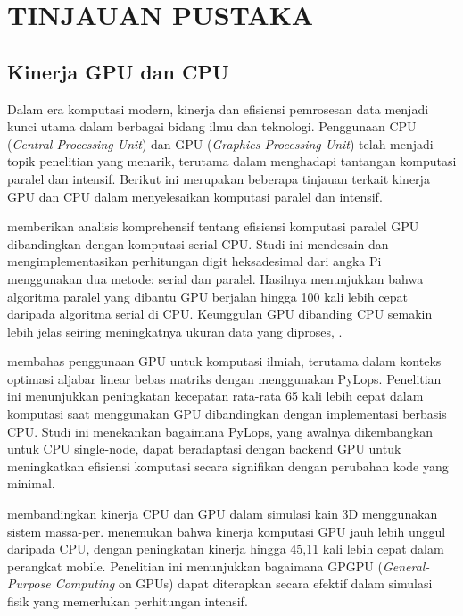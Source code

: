 \chapter{TINJAUAN PUSTAKA}
\label{tipus}


\section{Kinerja GPU dan CPU}

Dalam era komputasi modern, kinerja dan efisiensi pemrosesan data menjadi kunci utama
dalam berbagai bidang ilmu dan teknologi. Penggunaan CPU (\emph{Central
Processing Unit}) dan GPU (\emph{Graphics Processing Unit}) telah menjadi topik
penelitian yang menarik, terutama dalam menghadapi tantangan komputasi paralel dan
intensif. Berikut ini merupakan beberapa tinjauan terkait kinerja GPU dan CPU
dalam menyelesaikan komputasi paralel dan intensif.

\cite{tjandraParallelNumericalComputation2022} memberikan analisis komprehensif
tentang efisiensi komputasi paralel GPU dibandingkan dengan komputasi serial CPU.
Studi ini mendesain dan mengimplementasikan perhitungan digit heksadesimal dari angka
Pi menggunakan dua metode: serial dan paralel. Hasilnya menunjukkan bahwa algoritma
paralel yang dibantu GPU berjalan hingga 100 kali lebih cepat daripada algoritma
serial di CPU. Keunggulan GPU dibanding CPU semakin lebih jelas seiring
meningkatnya ukuran data yang diproses, .

\cite{ravasiLeveragingGPUsMatrixfree2021} membahas penggunaan GPU untuk
komputasi ilmiah, terutama dalam konteks optimasi aljabar linear bebas matriks dengan
menggunakan PyLops. Penelitian ini menunjukkan peningkatan kecepatan rata-rata
65 kali lebih cepat dalam komputasi saat menggunakan GPU dibandingkan dengan
implementasi berbasis CPU. Studi ini menekankan bagaimana PyLops, yang awalnya
dikembangkan untuk CPU single-node, dapat beradaptasi dengan backend GPU untuk meningkatkan
efisiensi komputasi secara signifikan dengan perubahan kode yang minimal.

\cite{choiParallelClothSimulation2018} membandingkan kinerja CPU dan GPU dalam simulasi
kain 3D menggunakan sistem massa-per. \cite{choiParallelClothSimulation2018}
menemukan bahwa kinerja komputasi GPU jauh lebih unggul daripada CPU, dengan peningkatan
kinerja hingga 45,11 kali lebih cepat dalam perangkat mobile. Penelitian ini
menunjukkan bagaimana GPGPU (\emph{General-Purpose Computing} on GPUs) dapat diterapkan
secara efektif dalam simulasi fisik yang memerlukan perhitungan intensif.

